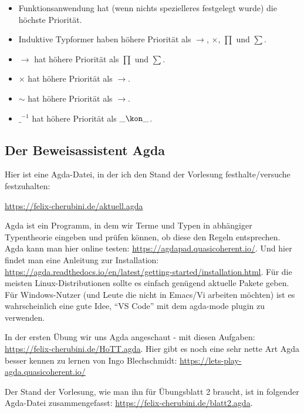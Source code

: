 \begin{itemize}
\item Funktionsanwendung hat (wenn nichts spezielleres festgelegt wurde) die höchste Priorität.
\item Induktive Typformer haben höhere Priorität als $\to$, $\times$, $\prod$ und $\sum$.
\item $\to$ hat höhere Priorität als $\prod$ und $\sum$.
\item $\times$ hat höhere Priorität als $\to$.
\item $\sim$ hat höhere Priorität als $\to$.
\item $\_^{-1}$ hat höhere Priorität als $\_\kon\_$.
\end{itemize}

\subsection{Der Beweisassistent Agda}
Hier ist eine Agda-Datei, in der ich den Stand der Vorlesung festhalte/versuche festzuhalten:
\begin{center}
  \url{https://felix-cherubini.de/aktuell.agda}
\end{center}

Agda ist ein Programm, in dem wir Terme und Typen in abhängiger Typentheorie eingeben und prüfen können, ob diese den Regeln entsprechen. Agda kann man hier online testen: \url{https://agdapad.quasicoherent.io/}. Und hier findet man eine Anleitung zur Installation: \url{https://agda.readthedocs.io/en/latest/getting-started/installation.html}. Für die meisten Linux-Distributionen sollte es einfach genügend aktuelle Pakete geben. Für Windows-Nutzer (und Leute die nicht in Emacs/Vi arbeiten möchten) ist es wahrscheinlich eine gute Idee, ``VS Code'' mit dem agda-mode plugin zu verwenden.

In der ersten Übung wir uns Agda angeschaut - mit diesen Aufgaben: \url{https://felix-cherubini.de/HoTT.agda}.
Hier gibt es noch eine sehr nette Art Agda besser kennen zu lernen von Ingo Blechschmidt:
\url{https://lets-play-agda.quasicoherent.io/}

Der Stand der Vorlesung, wie man ihn für Übungsblatt 2 braucht, ist in folgender Agda-Datei zusammengefasst: \url{https://felix-cherubini.de/blatt2.agda}.
